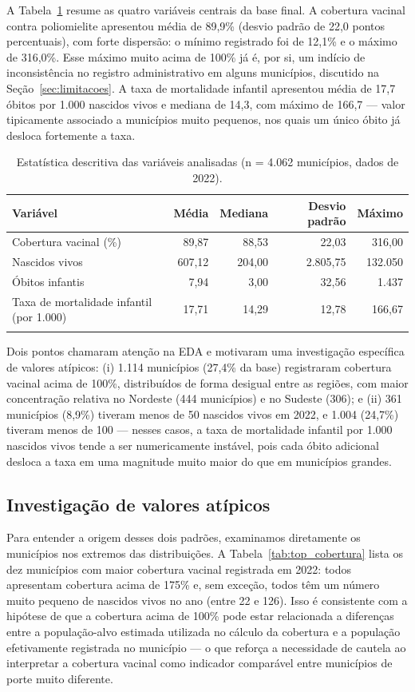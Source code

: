 \documentclass[pdflatex,sn-mathphys-num]{sn-jnl}
\begin{document}
A Tabela~\ref{tab:desc} resume as quatro variáveis centrais da base final. A cobertura vacinal contra poliomielite apresentou média de 89,9\% (desvio padrão de 22,0 pontos percentuais), com forte dispersão: o mínimo registrado foi de 12,1\% e o máximo de 316,0\%. Esse máximo muito acima de 100\% já é, por si, um indício de inconsistência no registro administrativo em alguns municípios, discutido na Seção~\ref{sec:limitacoes}. A taxa de mortalidade infantil apresentou média de 17,7 óbitos por 1.000 nascidos vivos e mediana de 14,3, com máximo de 166,7 — valor tipicamente associado a municípios muito pequenos, nos quais um único óbito já desloca fortemente a taxa.

\begin{table}[h]
\centering
\caption{Estatística descritiva das variáveis analisadas (n = 4.062 municípios, dados de 2022).}\label{tab:desc}
\begin{tabular}{@{}lrrrr@{}}
\toprule
Variável & Média & Mediana & Desvio padrão & Máximo \\
\midrule
Cobertura vacinal (\%) & 89,87 & 88,53 & 22,03 & 316,00 \\
Nascidos vivos & 607,12 & 204,00 & 2.805,75 & 132.050 \\
Óbitos infantis & 7,94 & 3,00 & 32,56 & 1.437 \\
Taxa de mortalidade infantil (por 1.000) & 17,71 & 14,29 & 12,78 & 166,67 \\
\botrule
\end{tabular}
\end{table}

Dois pontos chamaram atenção na EDA e motivaram uma investigação específica de valores atípicos: (i) 1.114 municípios (27,4\% da base) registraram cobertura vacinal acima de 100\%, distribuídos de forma desigual entre as regiões, com maior concentração relativa no Nordeste (444 municípios) e no Sudeste (306); e (ii) 361 municípios (8,9\%) tiveram menos de 50 nascidos vivos em 2022, e 1.004 (24,7\%) tiveram menos de 100 — nesses casos, a taxa de mortalidade infantil por 1.000 nascidos vivos tende a ser numericamente instável, pois cada óbito adicional desloca a taxa em uma magnitude muito maior do que em municípios grandes.

\subsection{Investigação de valores atípicos}\label{sec:outliers}

Para entender a origem desses dois padrões, examinamos diretamente os municípios nos extremos das distribuições. A Tabela~\ref{tab:top_cobertura} lista os dez municípios com maior cobertura vacinal registrada em 2022: todos apresentam cobertura acima de 175\% e, sem exceção, todos têm um número muito pequeno de nascidos vivos no ano (entre 22 e 126). Isso é consistente com a hipótese de que a cobertura acima de 100\% pode estar relacionada a diferenças entre a população-alvo estimada utilizada no cálculo da cobertura e a população efetivamente registrada no município — o que reforça a necessidade de cautela ao interpretar a cobertura vacinal como indicador comparável entre municípios de porte muito diferente.
\end{document}

